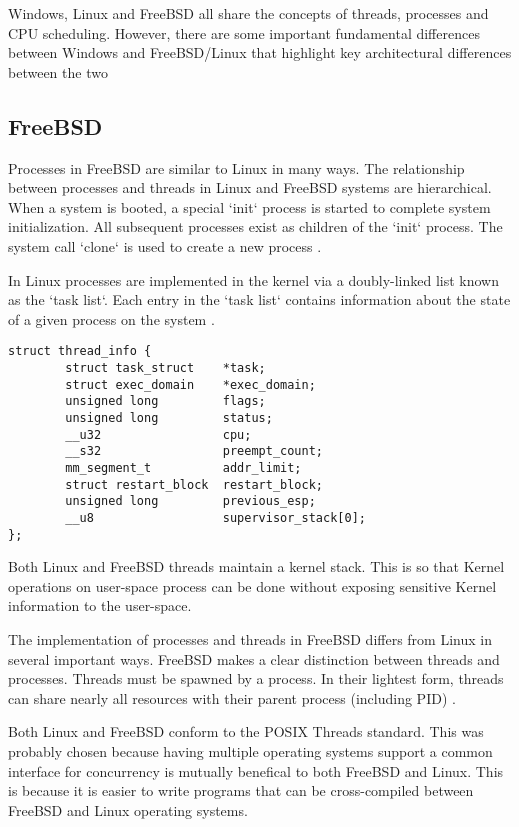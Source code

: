 \documentclass[onecolumn,10pt]{IEEETran}
\begin{document}
Windows, Linux and FreeBSD all share the concepts of threads, processes and CPU scheduling.  However, there are some important fundamental differences between Windows and FreeBSD/Linux that highlight key architectural differences between the two

\subsection{FreeBSD}

	Processes in FreeBSD are similar to Linux in many ways.  The relationship between processes and threads in Linux and FreeBSD systems are hierarchical.  When a system is booted, a special `init` process is started to complete system initialization.  All subsequent processes exist as children of the `init` process.  The system call `clone` is used to create a new process \cite{lkd}.

	In Linux processes are implemented in the kernel via a doubly-linked list known as the `task list`.  Each entry in the `task list` contains information about the state of a given process on the system \cite{lkd}.

\begin{lstlisting}
struct thread_info {
        struct task_struct    *task;
        struct exec_domain    *exec_domain;
        unsigned long         flags;
        unsigned long         status;
        __u32                 cpu;
        __s32                 preempt_count;
        mm_segment_t          addr_limit;
        struct restart_block  restart_block;
        unsigned long         previous_esp;
        __u8                  supervisor_stack[0];
};
\end{lstlisting}

	Both Linux and FreeBSD threads maintain a kernel stack.  This is so that Kernel operations on user-space process can be done without exposing sensitive Kernel information to the user-space.

	The implementation of processes and threads in FreeBSD differs from Linux in several important ways.  
	FreeBSD makes a clear distinction between threads and processes.  Threads must be spawned by a process.  In their lightest form, threads can share nearly all resources with their parent process (including PID) \cite{freebsd}.

	Both Linux and FreeBSD conform to the POSIX Threads standard.  This was probably chosen because  having multiple operating systems support a common interface for concurrency is mutually benefical to both FreeBSD and Linux.  This is because it is easier to write programs that can be cross-compiled between FreeBSD and Linux operating systems.
\end{document}
